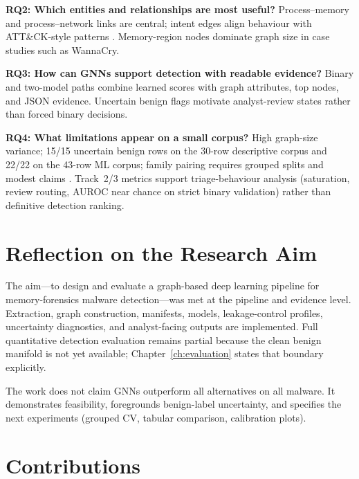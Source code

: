 \textbf{RQ2: Which entities and relationships are most useful?} Process--memory and process--network links are central; intent edges align behaviour with ATT\&CK-style patterns \cite{mitre2026enterprise}. Memory-region nodes dominate graph size in case studies such as WannaCry.

\textbf{RQ3: How can GNNs support detection with readable evidence?} Binary and two-model paths combine learned scores with graph attributes, top nodes, and JSON evidence. Uncertain benign flags motivate analyst-review states rather than forced binary decisions.

\textbf{RQ4: What limitations appear on a small corpus?} High graph-size variance; 15/15 uncertain benign rows on the 30-row descriptive corpus and 22/22 on the 43-row ML corpus; family pairing requires grouped splits and modest claims \cite{sommer2010outside}. Track~2/3 metrics support triage-behaviour analysis (saturation, review routing, AUROC near chance on strict binary validation) rather than definitive detection ranking.

\section{Reflection on the Research Aim}

The aim---to design and evaluate a graph-based deep learning pipeline for memory-forensics malware detection---was met at the pipeline and evidence level. Extraction, graph construction, manifests, models, leakage-control profiles, uncertainty diagnostics, and analyst-facing outputs are implemented. Full quantitative detection evaluation remains partial because the clean benign manifold is not yet available; Chapter~\ref{ch:evaluation} states that boundary explicitly.

The work does not claim GNNs outperform all alternatives on all malware. It demonstrates feasibility, foregrounds benign-label uncertainty, and specifies the next experiments (grouped CV, tabular comparison, calibration plots).

\section{Contributions}

